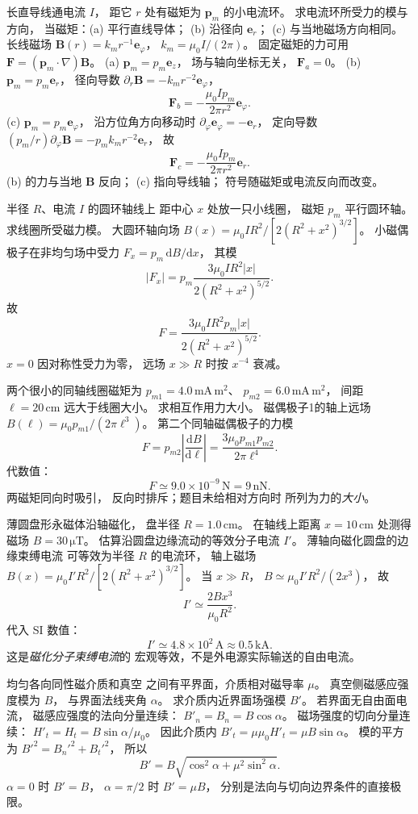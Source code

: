 长直导线通电流 $I$，
距它 $r$ 处有磁矩为 $\bm p_m$
的小电流环。
求电流环所受力的模与方向，
当磁矩：(a) 平行直线导体；
(b) 沿径向 $\bm e_r$；
(c) 与当地磁场方向相同。
\exsolution
长线磁场
$\bm B(r)=k_m r^{-1}\bm e_\varphi$，
$k_m=\mu_0I/(2\pi)$。
固定磁矩的力可用
$\bm F=(\bm p_m\cdot\nabla)\bm B$。
(a) $\bm p_m=p_m\bm e_z$，
场与轴向坐标无关，
$\boxed{\bm F_a=0}$。
(b) $\bm p_m=p_m\bm e_r$，
径向导数
$\partial_r\bm B=-k_mr^{-2}\bm e_\varphi$，
\[
\boxed{\bm F_b=
-\frac{\mu_0Ip_m}{2\pi r^2}\bm e_\varphi}.
\]
(c) $\bm p_m=p_m\bm e_\varphi$，
沿方位角方向移动时
$\partial_\varphi\bm e_\varphi=-\bm e_r$，
定向导数
$(p_m/r)\partial_\varphi\bm B
=-p_mk_m r^{-2}\bm e_r$，
故
\[
\boxed{\bm F_c=
-\frac{\mu_0Ip_m}{2\pi r^2}\bm e_r}.
\]
\excheck (b) 的力与当地 $\bm B$ 反向；
(c) 指向导线轴；
符号随磁矩或电流反向而改变。

半径 $R$、电流 $I$ 的圆环轴线上
距中心 $x$ 处放一只小线圈，
磁矩 $p_m$ 平行圆环轴。
求线圈所受磁力模。
\exsolution
大圆环轴向场
$B(x)=\mu_0IR^2/
[2(R^2+x^2)^{3/2}]$。
小磁偶极子在非均匀场中受力
$F_x=p_m\,\mathrm dB/\mathrm dx$，
其模
\[
|F_x|=p_m\frac{3\mu_0IR^2|x|}
{2(R^2+x^2)^{5/2}}.
\]
故
\[
\boxed{F=
\frac{3\mu_0IR^2p_m|x|}
{2(R^2+x^2)^{5/2}}}.
\]
\excheck $x=0$ 因对称性受力为零，
远场 $x\gg R$ 时按 $x^{-4}$ 衰减。

两个很小的同轴线圈磁矩为
$p_{m1}=4.0\,\mathrm{mA\,m^2}$、
$p_{m2}=6.0\,\mathrm{mA\,m^2}$，
间距 $\ell=20\,\mathrm{cm}$
远大于线圈大小。
求相互作用力大小。
\exsolution
磁偶极子1的轴上远场
$B(\ell)=\mu_0p_{m1}/(2\pi\ell^3)$。
第二个同轴磁偶极子的力模
\[
F=p_{m2}\left|\frac{\mathrm dB}{\mathrm d\ell}\right|
=\frac{3\mu_0p_{m1}p_{m2}}{2\pi\ell^4}.
\]
代数值：
\[
\boxed{F\simeq9.0\times10^{-9}\,\mathrm N=9\,\mathrm{nN}}.
\]
\excheck 两磁矩同向时吸引，
反向时排斥；题目未给相对方向时
所列为力的\emph{大小}。

薄圆盘形永磁体沿轴磁化，
盘半径 $R=1.0\,\mathrm{cm}$。
在轴线上距离 $x=10\,\mathrm{cm}$
处测得磁场 $B=30\,\mathrm{\mu T}$。
估算沿圆盘边缘流动的等效分子电流 $I'$。
\exsolution
薄轴向磁化圆盘的边缘束缚电流
可等效为半径 $R$ 的电流环，
轴上磁场
$B(x)=\mu_0I'R^2/
[2(R^2+x^2)^{3/2}]$。
当 $x\gg R$，
$B\simeq\mu_0I'R^2/(2x^3)$，
故
\[
\boxed{I'\simeq\frac{2Bx^3}{\mu_0R^2}}.
\]
代入 SI 数值：
\[
\boxed{I'\simeq4.8\times10^2\,\mathrm A
\approx0.5\,\mathrm{kA}}.
\]
\excheck 这是\emph{磁化分子束缚电流}的
宏观等效，不是外电源实际输送的自由电流。

均匀各向同性磁介质和真空
之间有平界面，介质相对磁导率 $\mu$。
真空侧磁感应强度模为 $B$，
与界面法线夹角 $\alpha$。
求介质内近界面场强模 $B'$。
\exsolution
若界面无自由面电流，
磁感应强度的法向分量连续：
$B'_n=B_n=B\cos\alpha$。
磁场强度的切向分量连续：
$H'_t=H_t=B\sin\alpha/\mu_0$。
因此介质内
$B'_t=\mu\mu_0H'_t=\mu B\sin\alpha$。
模的平方为
$B'^2=B_n'^2+B_t'^2$，
所以
\[
\boxed{B'=B\sqrt{\cos^2\alpha+
\mu^2\sin^2\alpha}}.
\]
\excheck $\alpha=0$ 时 $B'=B$，
$\alpha=\pi/2$ 时 $B'=\mu B$，
分别是法向与切向边界条件的直接极限。

